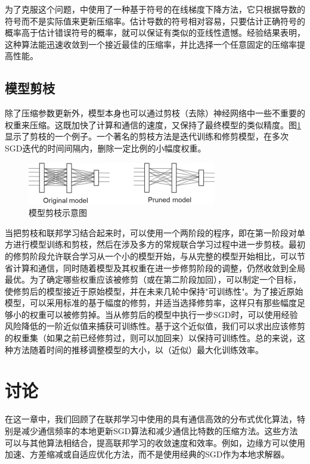 为了克服这个问题，中使用了一种基于符号的在线梯度下降方法\cite{han2020adaptive}，它只根据导数的符号而不是实际值来更新压缩率。估计导数的符号相对容易，只要估计正确符号的概率高于估计错误符号的概率，就可以保证有类似的亚线性遗憾。经验结果表明，这种算法能迅速收敛到一个接近最佳的压缩率，并比选择一个任意固定的压缩率提高性能。
	
\subsection{模型剪枝}
除了压缩参数更新外，模型本身也可以通过剪枝（去除）神经网络中一些不重要的权重来压缩。这既加快了计算和通信的速度，又保持了最终模型的类似精度\cite{frankle2018lottery, han2015deep}。图\ref{fig:6.6}显示了剪枝的一个例子。一个著名的剪枝方法是迭代训练和修剪模型，在多次SGD迭代的时间间隔内，删除一定比例的小幅度权重。
\begin{figure}[h]
	\centering
	\includegraphics{chapter06/images/Fig6}
	\caption{模型剪枝示意图}
	\label{fig:6.6}
\end{figure}
当把剪枝和联邦学习结合起来时，可以使用一个两阶段的程序，即在第一阶段对单方进行模型训练和剪枝，然后在涉及多方的常规联合学习过程中进一步剪枝。最初的修剪阶段允许联合学习从一个小的模型开始，与从完整的模型开始相比，可以节省计算和通信，同时随着模型及其权重在进一步修剪阶段的调整，仍然收敛到全局最优。为了确定哪些权重应该被修剪（或在第二阶段加回），可以制定一个目标，使修剪后的模型接近于原始模型，并在未来几轮中保持"可训练性"。为了接近原始模型，可以采用标准的基于幅度的修剪，并适当选择修剪率，这样只有那些幅度足够小的权重可以被修剪掉。当从修剪后的模型中执行一步SGD时，可以使用经验风险降低的一阶近似值来捕获可训练性。基于这个近似值，我们可以求出应该修剪的权重集（如果之前已经修剪过，则可以加回来）以保持可训练性。总的来说，这种方法随着时间的推移调整模型的大小，以（近似）最大化训练效率。
	
\section{讨论}
在这一章中，我们回顾了在联邦学习中使用的具有通信高效的分布式优化算法，特别是减少通信频率的本地更新SGD算法和减少通信比特数的压缩方法。这些方法可以与其他算法相结合，提高联邦学习的收敛速度和效率。例如，边缘方可以使用加速\cite{Wang2020SlowMo}、方差缩减\cite{karimireddy2020scaffold, li2019feddane}或自适应优化方法，而不是使用经典的SGD作为本地求解器。

%

